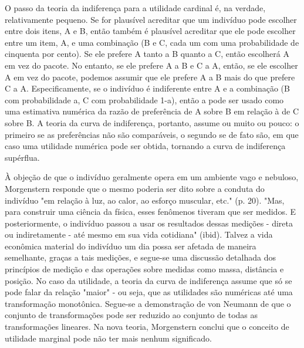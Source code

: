 \documentclass[a4paper,12pt]{article}[abntex2]
\begin{document}
O passo da teoria da indiferença para a utilidade cardinal é, na verdade, relativamente pequeno. Se for plausível acreditar que um indivíduo pode escolher entre dois itens, A e B, então também é plausível acreditar que ele pode escolher entre um item, A, e uma combinação (B e C, cada um com uma probabilidade de cinquenta por cento). Se ele prefere A tanto a B quanto a C, então escolherá A em vez do pacote. No entanto, se ele prefere A a B e C a A, então, se ele escolher A em vez do pacote, podemos assumir que ele prefere A a B mais do que prefere C a A. Especificamente, se o indivíduo é indiferente entre A e a combinação (B com probabilidade a, C com probabilidade 1-a), então a pode ser usado como uma estimativa numérica da razão de preferência de A sobre B em relação à de C sobre B. A teoria da curva de indiferença, portanto, assume ou muito ou pouco: o primeiro se as preferências não são comparáveis, o segundo se de fato são, em que caso uma utilidade numérica pode ser obtida, tornando a curva de indiferença supérflua.

À objeção de que o indivíduo geralmente opera em um ambiente vago e nebuloso, Morgenstern responde que o mesmo poderia ser dito sobre a conduta do indivíduo "em relação à luz, ao calor, ao esforço muscular, etc." (p. 20). "Mas, para construir uma ciência da física, esses fenômenos tiveram que ser medidos. E posteriormente, o indivíduo passou a usar os resultados dessas medições - direta ou indiretamente - até mesmo em sua vida cotidiana" (ibid). Talvez a vida econômica material do indivíduo um dia possa ser afetada de maneira semelhante, graças a tais medições, e segue-se uma discussão detalhada dos princípios de medição e das operações sobre medidas como massa, distância e posição. No caso da utilidade, a teoria da curva de indiferença assume que só se pode falar da relação "maior" - ou seja, que as utilidades são numéricas até uma transformação monotônica. Segue-se a demonstração de von Neumann de que o conjunto de transformações pode ser reduzido ao conjunto de todas as transformações lineares. Na nova teoria, Morgenstern conclui que o conceito de utilidade marginal pode não ter mais nenhum significado.
\end{document}
